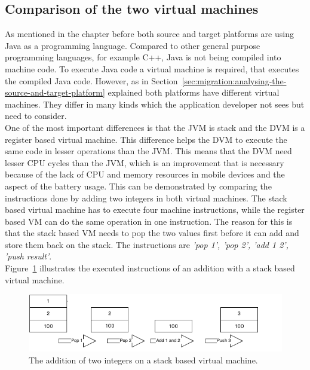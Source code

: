 \subsection{Comparison of the two virtual machines}
\label{sec:migration:comparison-of-the-two-virtual-machines}
As mentioned in the chapter before both source and target platforms are using Java as a programming language.
Compared to other general purpose programming languages, for example C++, Java is not being compiled into machine code.
To execute Java code a virtual machine is required, that executes the compiled Java code.
However, as in Section~\ref{sec:migration:analysing-the-source-and-target-platform} explained both platforms have different virtual machines.
They differ in many kinds which the application developer not sees but need to consider.
\\
One of the most important differences is that the JVM is stack and the DVM is a register based virtual machine.
This difference helps the DVM to execute the same code in lesser operations than the JVM.
This means that the DVM need lesser CPU cycles than the JVM, which is an improvement that is necessary because of the lack of CPU and memory resources in mobile devices and the aspect of the battery usage.
This can be demonstrated by comparing the instructions done by adding two integers in both virtual machines.
The stack based virtual machine has to execute four machine instructions, while the register based VM can do the same operation in one instruction.
The reason for this is that the stack based VM needs to pop the two values first before it can add and store them back on the stack.
The instructions are \textit{'pop 1', 'pop 2', 'add 1 2', 'push result'}.\\
Figure~\ref{fig:stack-based-addition} illustrates the executed instructions of an addition with a stack based virtual machine.
\begin{figure}[h]
\begin{center}
\includegraphics[scale=0.65]{images/stack-based-addition.png} 
\caption{The addition of two integers on a stack based virtual machine.}
\label{fig:stack-based-addition}
\end{center}
\end{figure}

